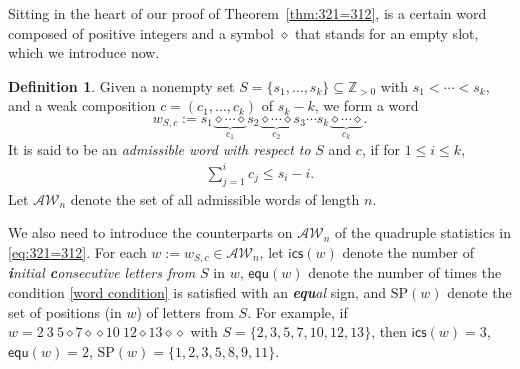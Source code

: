 \documentclass[12pt]{amsart}
\numberwithin{equation}{section}
\theoremstyle{plain}
\theoremstyle{definition}
\newtheorem{Def}[theorem]{Definition}
\newcommand{\Z}{\mathbb{Z}}
\def\AW{\mathcal{AW}}
\def\ics{\mathsf{ics}}
\def\equ{\mathsf{equ}}
\def\SP{\mathrm{SP}}
\begin{document}
Sitting in the heart of our proof of Theorem~\ref{thm:321=312}, is a certain word composed of positive integers and a symbol $\diamond$ that stands for an empty slot, which we introduce now.
\begin{Def}
Given a nonempty set $S=\{s_1,\ldots,s_k\}\subseteq \Z_{>0}$ with $s_1<\cdots<s_k$, and a weak composition $c=(c_1,\ldots,c_k)$ of $s_k-k$, we form a word $$w_{S,c}:=s_1\underbrace{\diamond\cdots\diamond}_{c_1}s_2\underbrace{\diamond\cdots\diamond}_{c_2}s_3\cdots s_k\underbrace{\diamond\cdots\diamond}_{c_k}.$$ It is said to be an {\em admissible word with respect to} $S$ and $c$, if for $1\le i \le k$,
\begin{align}
\sum_{j=1}^{i}c_j\le s_i-i. \tag{$\ast$}\label{word condition}
\end{align}
Let $\AW_n$ denote the set of all admissible words of length $n$.
\end{Def}
We also need to introduce the counterparts on $\AW_n$ of the quadruple statistics in \eqref{eq:321=312}. For each $w:=w_{S,c}\in\AW_n$, let $\ics(w)$ denote the number of {\em {\bf\em i}nitial {\bf\em c}onsecutive letters from $S$} in $w$, $\equ(w)$ denote the number of times the condition \eqref{word condition} is satisfied with an {\em {\bf\em equ}al} sign, and $\SP(w)$ denote the set of positions (in $w$) of letters from $S$. For example, if $w=2\:3\:5\diamond7\diamond \diamond 10\:12\diamond 13\diamond\diamond$ with $S=\{2,3,5,7,10,12,13\}$, then $\ics(w)=3$, $\equ(w)=2$, $\SP(w)=\{1,2,3,5,8,9,11\}$.
\end{document}
